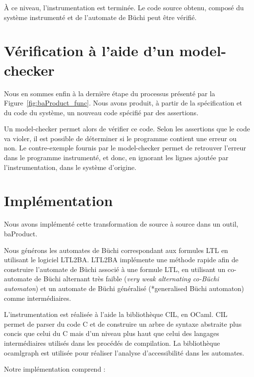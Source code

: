 À ce niveau, l'instrumentation est terminée. Le code source obtenu, composé du
système instrumenté et de l'automate de Büchi peut être vérifié.

\section{Vérification à l'aide d'un model-checker}

Nous en sommes enfin à la dernière étape du processus présenté par la
Figure~\ref{fig:baProduct_func}. Nous avons produit, à partir de la
spécification et du code du système, un nouveau code spécifié par des
assertions.

Un model-checker permet alors de vérifier ce code. Selon les assertions que le
code va violer, il est possible de déterminer si le programme contient une
erreur ou non. Le contre-exemple fournis par le model-checker permet de
retrouver l'erreur dans le programme instrumenté, et donc, en ignorant les
lignes ajoutée par l'instrumentation, dans le système d'origine.

\section{Implémentation}

Nous avons implémenté cette transformation de source à source dans un outil,
baProduct.

Nous générons les automates de Büchi correspondant aux formules LTL en
utilisant le logiciel LTL2BA\cite{ltl2ba}. LTL2BA implémente
une méthode rapide afin de construire l'automate de Büchi associé à une
formule LTL, en utilisant un co-automate de Büchi alternant très faible
(\emph{very weak alternating co-Büchi automaton}) et un automate de
Büchi généralisé (*generalised Büchi automaton) comme intermédiaires.

L'instrumentation est réalisée à l'aide la bibliothèque
CIL\cite{cil}, en OCaml\cite{ocamlrefman}. CIL permet de parser
du code C et de construire un arbre de syntaxe abstraite plus concis que
celui du C mais d'un niveau plus haut que celui des langages
intermédiaires utilisés dans les procédés de compilation. La
bibliothèque ocamlgraph\cite{ocamlgraph} est utilisée pour réaliser
l'analyse d'accessibilité dans les automates.

Notre implémentation comprend :

